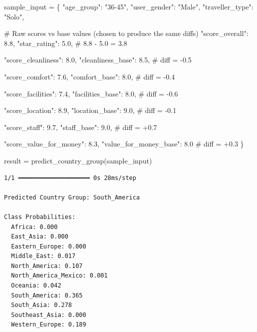 \documentclass[
  letterpaper,
  DIV=11,
  numbers=noendperiod]{scrartcl}
\newenvironment{Shaded}{\begin{snugshade}}{\end{snugshade}}
\newcommand{\CommentTok}[1]{\textcolor[rgb]{0.37,0.37,0.37}{#1}}
\newcommand{\FloatTok}[1]{\textcolor[rgb]{0.68,0.00,0.00}{#1}}
\newcommand{\NormalTok}[1]{\textcolor[rgb]{0.00,0.23,0.31}{#1}}
\newcommand{\OperatorTok}[1]{\textcolor[rgb]{0.37,0.37,0.37}{#1}}
\newcommand{\StringTok}[1]{\textcolor[rgb]{0.13,0.47,0.30}{#1}}
\begin{document}
\begin{Shaded}
\begin{Highlighting}[]
\NormalTok{sample\_input }\OperatorTok{=}\NormalTok{ \{}
    \StringTok{"age\_group"}\NormalTok{: }\StringTok{"36{-}45"}\NormalTok{,}
    \StringTok{"user\_gender"}\NormalTok{: }\StringTok{"Male"}\NormalTok{,}
    \StringTok{"traveller\_type"}\NormalTok{: }\StringTok{"Solo"}\NormalTok{,}

    \CommentTok{\# Raw scores vs base values (chosen to produce the same diffs)}
    \StringTok{"score\_overall"}\NormalTok{: }\FloatTok{8.8}\NormalTok{,}
    \StringTok{"star\_rating"}\NormalTok{: }\FloatTok{5.0}\NormalTok{,                      }\CommentTok{\# 8.8 {-} 5.0 = 3.8}

    \StringTok{"score\_cleanliness"}\NormalTok{: }\FloatTok{8.0}\NormalTok{,}
    \StringTok{"cleanliness\_base"}\NormalTok{: }\FloatTok{8.5}\NormalTok{,                 }\CommentTok{\# diff = {-}0.5}

    \StringTok{"score\_comfort"}\NormalTok{: }\FloatTok{7.6}\NormalTok{,}
    \StringTok{"comfort\_base"}\NormalTok{: }\FloatTok{8.0}\NormalTok{,                     }\CommentTok{\# diff = {-}0.4}

    \StringTok{"score\_facilities"}\NormalTok{: }\FloatTok{7.4}\NormalTok{,}
    \StringTok{"facilities\_base"}\NormalTok{: }\FloatTok{8.0}\NormalTok{,                  }\CommentTok{\# diff = {-}0.6}

    \StringTok{"score\_location"}\NormalTok{: }\FloatTok{8.9}\NormalTok{,}
    \StringTok{"location\_base"}\NormalTok{: }\FloatTok{9.0}\NormalTok{,                    }\CommentTok{\# diff = {-}0.1}

    \StringTok{"score\_staff"}\NormalTok{: }\FloatTok{9.7}\NormalTok{,}
    \StringTok{"staff\_base"}\NormalTok{: }\FloatTok{9.0}\NormalTok{,                       }\CommentTok{\# diff = +0.7}

    \StringTok{"score\_value\_for\_money"}\NormalTok{: }\FloatTok{8.3}\NormalTok{,}
    \StringTok{"value\_for\_money\_base"}\NormalTok{: }\FloatTok{8.0}              \CommentTok{\# diff = +0.3}
\NormalTok{\}}


\NormalTok{result }\OperatorTok{=}\NormalTok{ predict\_country\_group(sample\_input)}
\end{Highlighting}
\end{Shaded}

\begin{verbatim}
1/1 ━━━━━━━━━━━━━━━━━━━━ 0s 28ms/step

Predicted Country Group: South_America

Class Probabilities:
  Africa: 0.000
  East_Asia: 0.000
  Eastern_Europe: 0.000
  Middle_East: 0.017
  North_America: 0.107
  North_America_Mexico: 0.001
  Oceania: 0.042
  South_America: 0.365
  South_Asia: 0.278
  Southeast_Asia: 0.000
  Western_Europe: 0.189
\end{verbatim}
\end{document}
